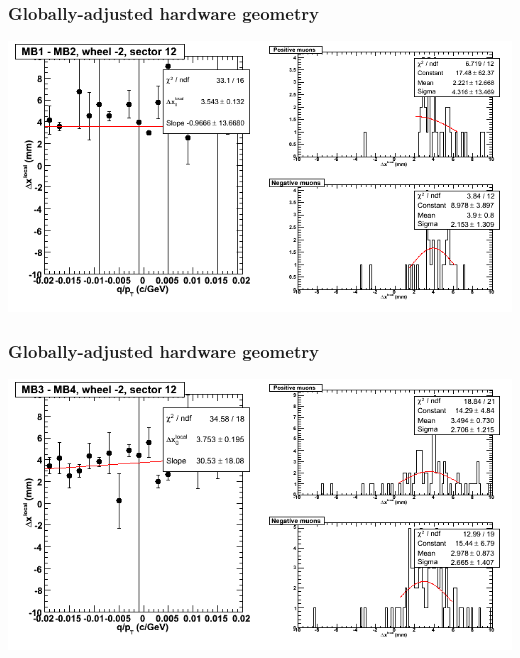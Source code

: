 \documentclass[compress]{beamer}
\begin{document}
\begin{frame}
\frametitle{Globally-adjusted hardware geometry}
\includegraphics[width=\linewidth]{NOV4_segdiffs_HW/dt13_resid_A_12_12.png}
\end{frame}

\begin{frame}
\frametitle{Globally-adjusted hardware geometry}
\includegraphics[width=\linewidth]{NOV4_segdiffs_HW/dt13_resid_A_12_34.png}
\end{frame}
\end{document}
